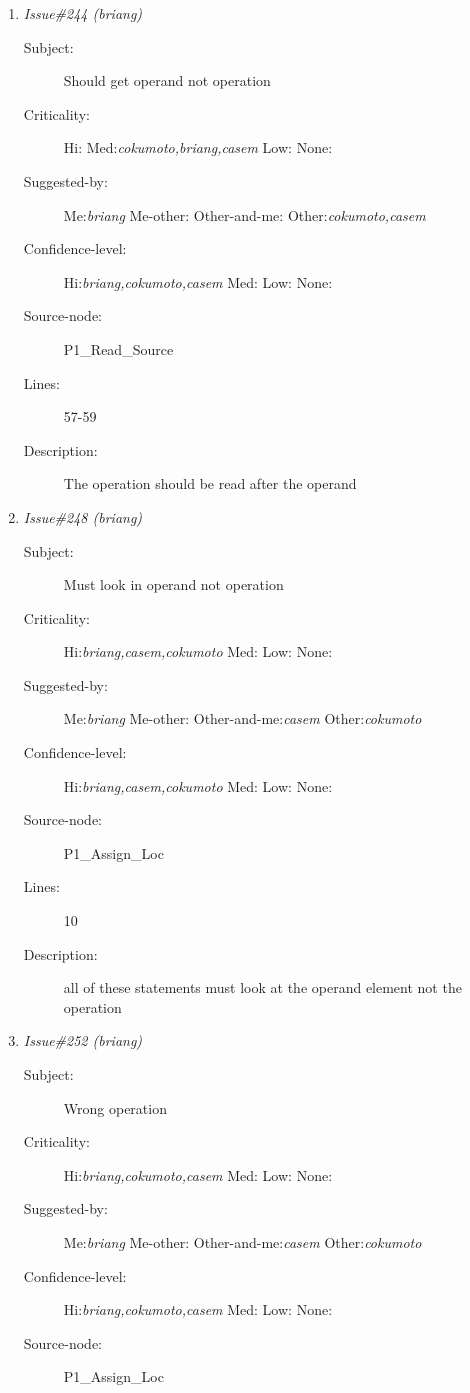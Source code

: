 \begin{enumerate}
\begin{description}
\item [Lines:] 55

\item [Description:] I should be set to 8
\end{description}
\item {\it Issue\#244 (briang)}
\begin{description}
\item [Subject:] Should get operand not operation
\item [Criticality:] Hi:{\it } Med:{\it cokumoto,briang,casem} Low:{\it } None:{\it }
\item [Suggested-by:] Me:{\it briang} Me-other:{\it } Other-and-me:{\it } Other:{\it cokumoto,casem}
\item [Confidence-level:] Hi:{\it briang,cokumoto,casem} Med:{\it } Low:{\it } None:{\it }
\item [Source-node:] P1\_Read\_Source

\item [Lines:] 57-59

\item [Description:] The operation should be read after the operand
\end{description}
\item {\it Issue\#248 (briang)}
\begin{description}
\item [Subject:] Must look in operand not operation
\item [Criticality:] Hi:{\it briang,casem,cokumoto} Med:{\it } Low:{\it } None:{\it }
\item [Suggested-by:] Me:{\it briang} Me-other:{\it } Other-and-me:{\it casem} Other:{\it cokumoto}
\item [Confidence-level:] Hi:{\it briang,casem,cokumoto} Med:{\it } Low:{\it } None:{\it }
\item [Source-node:] P1\_Assign\_Loc

\item [Lines:] 10

\item [Description:] all of these statements must look at the
operand element not the operation
\end{description}
\item {\it Issue\#252 (briang)}
\begin{description}
\item [Subject:] Wrong operation
\item [Criticality:] Hi:{\it briang,cokumoto,casem} Med:{\it } Low:{\it } None:{\it }
\item [Suggested-by:] Me:{\it briang} Me-other:{\it } Other-and-me:{\it casem} Other:{\it cokumoto}
\item [Confidence-level:] Hi:{\it briang,cokumoto,casem} Med:{\it } Low:{\it } None:{\it }
\item [Source-node:] P1\_Assign\_Loc


\end{description}
\end{enumerate}
